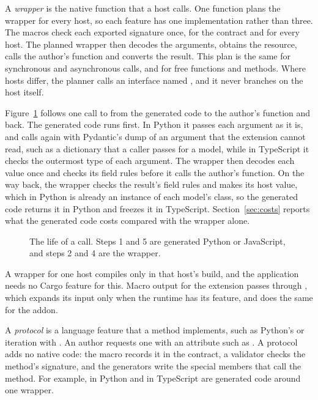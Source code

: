 \documentclass[sigconf,nonacm]{acmart}
\begin{document}
A \emph{wrapper} is the native function that a host calls. One function plans the wrapper for every host, so each feature has one implementation rather than three. The macros check each exported signature once, for the contract and for every host. The planned wrapper then decodes the arguments, obtains the resource, calls the author's function and converts the result. This plan is the same for synchronous and asynchronous calls, and for free functions and methods. Where hosts differ, the planner calls an interface named , and it never branches on the host itself.

Figure~\ref{fig:call} follows one call to  from the generated code to the author's function and back. The generated code runs first. In Python it passes each argument as it is, and calls again with Pydantic's dump of an argument that the extension cannot read, such as a dictionary that a caller passes for a model, while in TypeScript it checks the outermost type of each argument. The wrapper then decodes each value once and checks its field rules before it calls the author's function. On the way back, the wrapper checks the result's field rules and makes its host value, which in Python is already an instance of each model's class, so the generated code returns it in Python and freezes it in TypeScript. Section~\ref{sec:costs} reports what the generated code costs compared with the wrapper alone.

\begin{figure}[t]
\centering

\caption{The life of a call. Steps 1 and 5 are generated Python or JavaScript, and steps 2 and 4 are the wrapper.}
\label{fig:call}
\end{figure}

A wrapper for one host compiles only in that host's build, and the application needs no Cargo feature for this. Macro output for the extension passes through , which expands its input only when the runtime has its  feature, and  does the same for the addon.

A \emph{protocol} is a language feature that a method implements, such as Python's  or iteration with . An author requests one with an attribute such as . A protocol adds no native code: the macro records it in the contract, a validator checks the method's signature, and the generators write the special members that call the method. For example,  in Python and  in TypeScript are generated code around one wrapper.
\end{document}
